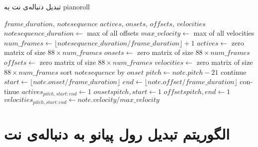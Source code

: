 \begin{algorithm}
\caption{تبدیل دنباله‌ی نت به \gls{pianoroll}}
\begin{algorithmic}
\begin{latin}
    \Require $frame\_duration$, $notesequence$
    \Ensure $actives$, $onsets$, $offsets$, $velocities$
    \State $notesequence\_duration \leftarrow$ max of all offsets
    \State $max\_velocity \leftarrow$ max of all velocities
    \State $num\_frames \leftarrow \lfloor notesequence\_duration / frame\_duration \rfloor + 1$
    \State $actives \leftarrow$ zero matrix of size $88 \times num\_frames$
    \State $onsets \leftarrow$ zero matrix of size $88 \times num\_frames$
    \State $offsets \leftarrow$ zero matrix of size $88 \times num\_frames$
    \State $velocities \leftarrow$ zero matrix of size $88 \times num\_frames$
    \State sort $notesequence$ by $onset$
        \State $pitch \leftarrow note.pitch - 21$
            \State continue
        \EndIf
        \State $start \leftarrow \lfloor note.onset / frame\_duration \rfloor$
        \State $end \leftarrow \lfloor note.offset / frame\_duration \rfloor$
            \State continue
        \EndIf
        \State $actives_{pitch, start:end} \leftarrow 1$
        \State $onsets{pitch, start} \leftarrow 1$
        \State $offsets{pitch, end} \leftarrow 1$
        \State $velocities_{pitch, start:end} \leftarrow note.velocity / max\_velocity$
    \EndFor
\end{latin}
\end{algorithmic}
\end{algorithm}

\section{الگوریتم تبدیل رول پیانو به دنباله‌ی نت}